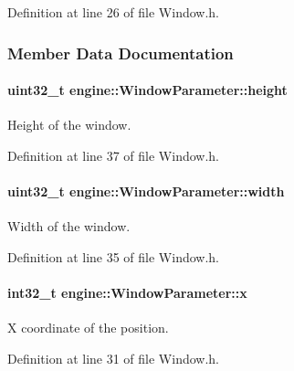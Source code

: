 Definition at line 26 of file Window.\+h.



\subsubsection{Member Data Documentation}
\paragraph[{\texorpdfstring{height}{height}}]{\setlength{\rightskip}{0pt plus 5cm}uint32\+\_\+t engine\+::\+Window\+Parameter\+::height}\hypertarget{a00091_a9a2039d074f22d4c639ef5254fc30fb7}{}\label{a00091_a9a2039d074f22d4c639ef5254fc30fb7}
Height of the window. 

Definition at line 37 of file Window.\+h.

\paragraph[{\texorpdfstring{width}{width}}]{\setlength{\rightskip}{0pt plus 5cm}uint32\+\_\+t engine\+::\+Window\+Parameter\+::width}\hypertarget{a00091_a068d271ecfc95b7c3dcf19e43b2a65f4}{}\label{a00091_a068d271ecfc95b7c3dcf19e43b2a65f4}
Width of the window. 

Definition at line 35 of file Window.\+h.

\paragraph[{\texorpdfstring{x}{x}}]{\setlength{\rightskip}{0pt plus 5cm}int32\+\_\+t engine\+::\+Window\+Parameter\+::x}\hypertarget{a00091_a1ae6e0c7a9ad94617c7b8e3c54faabf5}{}\label{a00091_a1ae6e0c7a9ad94617c7b8e3c54faabf5}
X coordinate of the position. 

Definition at line 31 of file Window.\+h.

